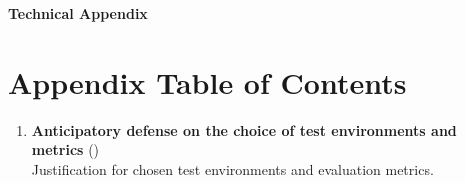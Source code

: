\documentclass{article}
\begin{document}
\begin{center}
    \textbf{\huge Technical Appendix}
\end{center}
\section*{Appendix Table of Contents}
\begin{enumerate}
    \item \textbf{Anticipatory defense on the choice of test environments and metrics} () \\
    Justification for chosen test environments and evaluation metrics.
\end{enumerate}


\end{document}
